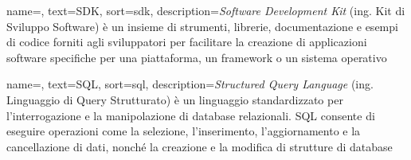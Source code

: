  {
    name=,
    text=SDK,
    sort=sdk,
    description={\emph{Software Development Kit} (ing. Kit di Sviluppo Software) è un insieme di strumenti, librerie, documentazione e esempi di codice forniti agli sviluppatori per facilitare la creazione di applicazioni software specifiche per una piattaforma, un framework o un sistema operativo}
}

 {
    name=,
    text=SQL,
    sort=sql,
    description={\emph{Structured Query Language} (ing. Linguaggio di Query Strutturato) è un linguaggio standardizzato per l'interrogazione e la manipolazione di database relazionali. SQL consente di eseguire operazioni come la selezione, l'inserimento, l'aggiornamento e la cancellazione di dati, nonché la creazione e la modifica di strutture di database}
}